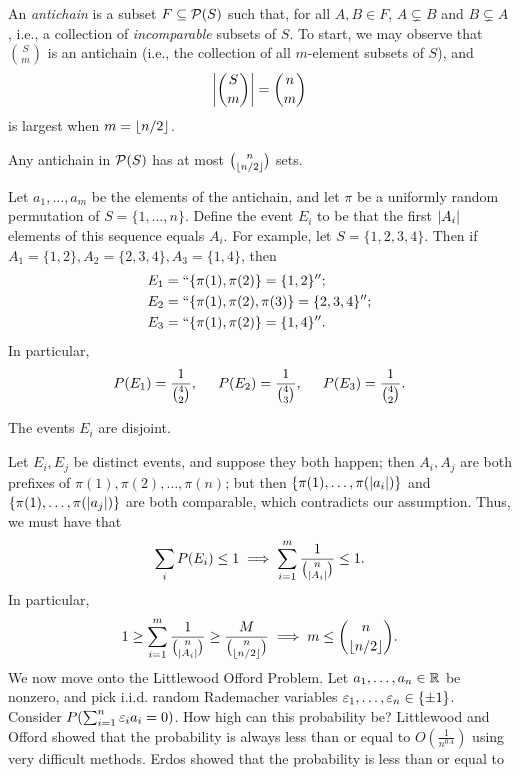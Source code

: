 An \textit{antichain} is a subset $F \subseteq \mathcal P(S)$  such that, for all $A, B \in F$, $A \subsetneq B$ and $B \subsetneq A$, i.e., a collection of \textit{incomparable} subsets of $S$. To start, we may observe that $\binom{S}{m}$ is an antichain (i.e., the collection of all $m$-element subsets of $S$), and
\[ \left\lvert \binom{S}{m} \right\rvert = \binom{n}{m} \]
is largest when $m = \left\lfloor n/2 \right\rfloor$.
\begin{simplelemma}
    Any antichain in $\mathcal P(S)$ has at most $\binom{n}{\left\lfloor n/2 \right\rfloor}$ sets.
\end{simplelemma}
\noindent Let $a_1, \dots, a_m$ be the elements of the antichain, and let $\pi$ be a uniformly random permutation of $S = \{1, \dots, n\}$. Define the event $E_i$ to be that the first $\left\lvert A_i \right\rvert$ elements of this sequence equals $A_i$. For example, let $S = \{1, 2, 3, 4\}$. Then if $A_1 = \{1, 2\}, A_2 = \{2, 3, 4\}, A_3 = \{1, 4\}$, then
\begin{align*}
    E_1 &= ``\{\pi(1), \pi(2)\} = \{1, 2\}''; \\
    E_2 &= ``\{\pi(1), \pi(2), \pi(3)\} = \{2, 3, 4\}''; \\
    E_3 &= ``\{\pi(1), \pi(2)\} = \{1, 4\}''.
\end{align*}
In particular,
\[ P(E_1) = \frac{1}{\binom{4}{2}}, \hspace{0.2in} P(E_2) = \frac{1}{\binom{4}{3}}, \hspace{0.2in} P(E_3) = \frac{1}{\binom{4}{2}}. \]
\begin{simpleclaim}
    The events $E_i$ are disjoint.
\end{simpleclaim}
\noindent Let $E_i, E_j$ be distinct events, and suppose they both happen; then $A_i, A_j$ are both prefixes of $\pi(1), \pi(2), \dots, \pi(n)$; but then $\{\pi(1), \dots, \pi(\left\lvert a_i \right\rvert)\}$ and $\{\pi(1), \dots, \pi(\left\lvert a_j \right\rvert)\}$ are both comparable, which contradicts our assumption.
\medskip\newline
Thus, we must have that
\[ \sum_i P(E_i) \leq 1 \implies \sum_{i=1}^m \frac{1}{\binom{n}{\left\lvert A_i \right\rvert}} \leq 1. \]
In particular,
\[ 1 \geq \sum_{i=1}^m \frac{1}{\binom{n}{\left\lvert A_i \right\rvert}} \geq \frac{M}{\binom{n}{\left\lfloor n/2 \right\rfloor}} \implies m \leq \binom{n}{\left\lfloor n/2 \right\rfloor}. \]
We now move onto the Littlewood Offord Problem. Let $a_1, \dots, a_n \in \mathbb R$ be nonzero, and pick i.i.d. random Rademacher variables $\varepsilon_1, \dots, \varepsilon_n \in \{\pm 1\}$. Consider $P(\sum_{i=1}^n \varepsilon_i a_i = 0)$. How high can this probability be? Littlewood and Offord showed that the probability is always less than or equal to $O(\frac{1}{n^{0.4}})$ using very difficult methods. Erdos showed that the probability is less than or equal to
